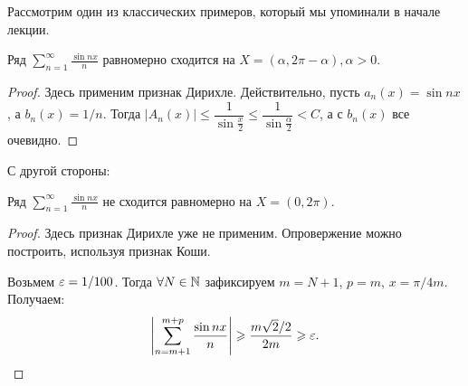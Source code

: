 \documentclass[a4paper, 12pt]{article}
\begin{document}
	
	Рассмотрим один из классических примеров, который мы упоминали в начале лекции.
	\begin{Examples}
		Ряд $\sum\limits_{n = 1}^\infty \frac{\sin nx}{n}$ равномерно сходится на $X=(\alpha, 2\pi-\alpha), \alpha>0$.
	\end{Examples}
	
	\begin{proof} 
	Здесь применим признак Дирихле. Действительно, пусть $a_n(x) = \sin nx$, а $b_n(x) = 1/n$. Тогда $|A_n(x)| \leq \dfrac{1}{\sin \frac{x}{2}} \leq \dfrac{1}{\sin \frac{\alpha}{2}} < C$, а с $b_n(x)$ все очевидно.
	\end{proof}
	
	С другой стороны:
	\begin{Examples}
		Ряд $\sum\limits_{n = 1}^\infty \frac{\sin nx}{n}$ не сходится равномерно на $X=(0, 2\pi)$.
	\end{Examples}
	\begin{proof}
		Здесь признак Дирихле уже не применим. Опровержение можно построить, используя признак Коши.
		
		Возьмем $\varepsilon = 1/100$. Тогда $\forall N \in \mathbb{N}$ зафиксируем $m = N+1$, $p = m$, $x = \pi/4m$. Получаем:
		$$
		\left| \sum\limits_{n=m+1}^{m+p} \frac{\sin nx}{n} \right| \geqslant \dfrac{m\sqrt{2} / 2}{2m} \geqslant \varepsilon.
		$$
	\end{proof}
\end{document}
